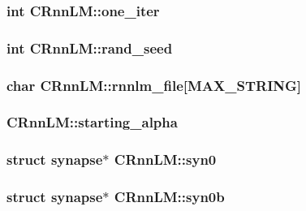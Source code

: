 \subsubsection[{one\+\_\+iter}]{\setlength{\rightskip}{0pt plus 5cm}int C\+Rnn\+L\+M\+::one\+\_\+iter}\hypertarget{class_c_rnn_l_m_af26096811bec7505c022a33bfb0b8fce}{}\label{class_c_rnn_l_m_af26096811bec7505c022a33bfb0b8fce}
\subsubsection[{rand\+\_\+seed}]{\setlength{\rightskip}{0pt plus 5cm}int C\+Rnn\+L\+M\+::rand\+\_\+seed}\hypertarget{class_c_rnn_l_m_ae74feac6f8ba9fbc03c10918551ed838}{}\label{class_c_rnn_l_m_ae74feac6f8ba9fbc03c10918551ed838}
\subsubsection[{rnnlm\+\_\+file}]{\setlength{\rightskip}{0pt plus 5cm}char C\+Rnn\+L\+M\+::rnnlm\+\_\+file\mbox{[}{\bf M\+A\+X\+\_\+\+S\+T\+R\+I\+NG}\mbox{]}}\hypertarget{class_c_rnn_l_m_a3ec8fbcecea020938513a5e3546bfbf8}{}\label{class_c_rnn_l_m_a3ec8fbcecea020938513a5e3546bfbf8}
\subsubsection[{starting\+\_\+alpha}]{ C\+Rnn\+L\+M\+::starting\+\_\+alpha}\hypertarget{class_c_rnn_l_m_aa3456f305cc32b366c90c226537d3da7}{}\label{class_c_rnn_l_m_aa3456f305cc32b366c90c226537d3da7}
\subsubsection[{syn0}]{\setlength{\rightskip}{0pt plus 5cm}struct {\bf synapse}$\ast$ C\+Rnn\+L\+M\+::syn0}\hypertarget{class_c_rnn_l_m_aeb087a773069e59532a413740a148a0f}{}\label{class_c_rnn_l_m_aeb087a773069e59532a413740a148a0f}
\subsubsection[{syn0b}]{\setlength{\rightskip}{0pt plus 5cm}struct {\bf synapse}$\ast$ C\+Rnn\+L\+M\+::syn0b}\hypertarget{class_c_rnn_l_m_aa64a6491bcde56dd2a2b8e7c00380c7f}{}\label{class_c_rnn_l_m_aa64a6491bcde56dd2a2b8e7c00380c7f}
